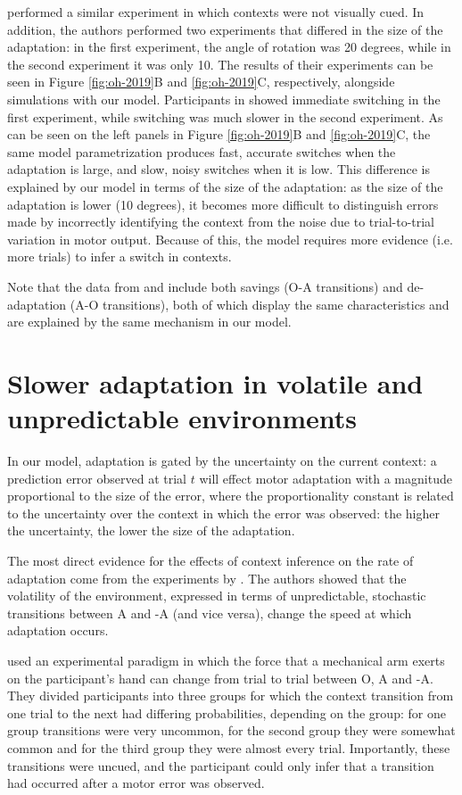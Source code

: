 \documentclass[a4paper,doc,floatsintext,natbib]{apa6}
\def \fref #1{Figure \ref{#1}}     %
\begin{document}
\cite{Oh_Minimizing_2019} performed a similar experiment in which contexts were not visually cued. In addition, the authors performed two experiments that differed in the size of the adaptation: in the first experiment, the angle of rotation was 20 degrees, while in the second experiment it was only 10. The results of their experiments can be seen in \fref{fig:oh-2019}B and \ref{fig:oh-2019}C, respectively, alongside simulations with our model. Participants in \cite{Oh_Minimizing_2019} showed immediate switching in the first experiment, while switching was much slower in the second experiment. As can be seen on the left panels in \fref{fig:oh-2019}B and \ref{fig:oh-2019}C, the same model parametrization produces fast, accurate switches when the adaptation is large, and slow, noisy switches when it is low. This difference is explained by our model in terms of the size of the adaptation: as the size of the adaptation is lower (10 degrees), it becomes more difficult to distinguish errors made by incorrectly identifying the context from the noise due to trial-to-trial variation in motor output. Because of this, the model requires more evidence (i.e. more trials) to infer a switch in contexts.

Note that the data from \cite{Oh_Minimizing_2019} and \cite{Kim_Neural_2015} include both savings (O-A transitions) and de-adaptation (A-O transitions), both of which display the same characteristics and are explained by the same mechanism in our model.


\section{Slower adaptation in volatile and unpredictable environments}
In our model, adaptation is gated by the uncertainty on the current context: a prediction error observed at trial $t$ will effect motor adaptation with a magnitude proportional to the size of the error, where the proportionality constant is related to the uncertainty over the context in which the error was observed: the higher the uncertainty, the lower the size of the adaptation.

The most direct evidence for the effects of context inference on the rate of adaptation come from the experiments by \cite{Herzfeld_memory_2014}. The authors showed that the volatility of the environment, expressed in terms of unpredictable, stochastic transitions between A and -A (and vice versa), change the speed at which adaptation occurs.

\cite{Herzfeld_memory_2014} used an experimental paradigm in which the force that a mechanical arm exerts on the participant's hand can change from trial to trial between O, A and -A. They divided participants into three groups for which the context transition from one trial to the next had differing probabilities, depending on the group: for one group transitions were very uncommon, for the second group they were somewhat common and for the third group they were almost every trial. Importantly, these transitions were uncued, and the participant could only infer that a transition had occurred after a motor error was observed.
\end{document}
